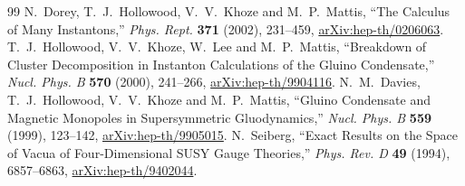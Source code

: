 \documentclass[11pt]{article}
\numberwithin{equation}{section}
\numberwithin{figure}{section}
\numberwithin{table}{section}
\theoremstyle{definition}
\begin{document}
\begin{thebibliography}{99}
N.~Dorey, T.~J.~Hollowood, V.~V.~Khoze and M.~P.~Mattis, ``The Calculus of Many Instantons,'' \emph{Phys. Rept.} \textbf{371} (2002), 231--459, \href{https://arxiv.org/abs/hep-th/0206063}{arXiv:hep-th/0206063}.
T.~J.~Hollowood, V.~V.~Khoze, W.~Lee and M.~P.~Mattis, ``Breakdown of Cluster Decomposition in Instanton Calculations of the Gluino Condensate,'' \emph{Nucl. Phys. B} \textbf{570} (2000), 241--266, \href{https://arxiv.org/abs/hep-th/9904116}{arXiv:hep-th/9904116}.
N.~M.~Davies, T.~J.~Hollowood, V.~V.~Khoze and M.~P.~Mattis, ``Gluino Condensate and Magnetic Monopoles in Supersymmetric Gluodynamics,'' \emph{Nucl. Phys. B} \textbf{559} (1999), 123--142, \href{https://arxiv.org/abs/hep-th/9905015}{arXiv:hep-th/9905015}.
N.~Seiberg, ``Exact Results on the Space of Vacua of Four-Dimensional SUSY Gauge Theories,'' \emph{Phys. Rev. D} \textbf{49} (1994), 6857--6863, \href{https://arxiv.org/abs/hep-th/9402044}{arXiv:hep-th/9402044}.
\end{thebibliography}
\end{document}
